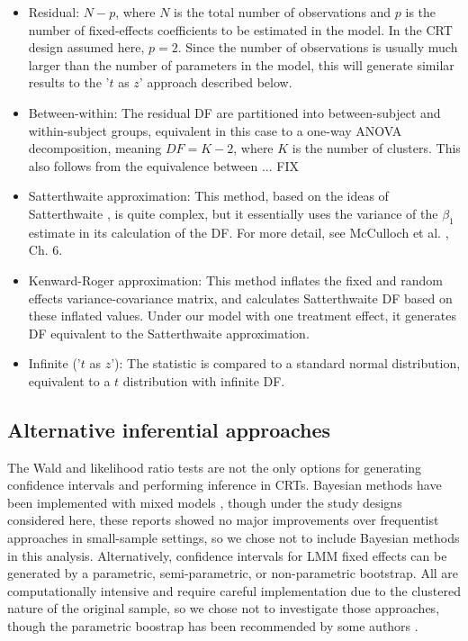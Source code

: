 \documentclass[twocolumn]{bmcart}%
\begin{document}
\begin{itemize}
  \item Residual: $N - p$, where $N$ is the total number of observations and $p$ is the number of fixed-effects coefficients to be estimated in the model. In the CRT design assumed here, $p=2$. Since the number of observations is usually much larger than the number of parameters in the model, this will generate similar results to the '$t$ as $z$' approach described below.
  \item Between-within: The residual DF are partitioned into between-subject and within-subject groups, equivalent in this case to a one-way ANOVA decomposition, meaning $DF = K-2$, where $K$ is the number of clusters. This also follows from the equivalence between ... FIX
  \item Satterthwaite approximation: This method, based on the ideas of Satterthwaite \cite{satterthwaite_approximate_1946}, is quite complex, but it essentially uses the variance of the $\beta_1$ estimate in its calculation of the DF. For more detail, see McCulloch et al. \cite{mcculloch_generalized_2008}, Ch. 6.
  \item Kenward-Roger approximation: This method \cite{kenward_small_1997} inflates the fixed and random effects variance-covariance matrix, and calculates Satterthwaite DF based on these inflated values. Under our model with one treatment effect, it generates DF equivalent to the Satterthwaite approximation.
  \item Infinite ('$t$ as $z$'): The statistic is compared to a standard normal distribution, equivalent to a $t$ distribution with infinite DF.
\end{itemize}

\subsection*{Alternative inferential approaches}

The Wald and likelihood ratio tests are not the only options for generating confidence intervals and performing inference in CRTs. Bayesian methods have been implemented with mixed models \cite{browne_comparison_2006, baldwin_bayesian_2013}, though under the study designs considered here, these reports showed no major improvements over frequentist approaches in small-sample settings, so we chose not to include Bayesian methods in this analysis. Alternatively, confidence intervals for LMM fixed effects can be generated by a parametric, semi-parametric, or non-parametric bootstrap. All are computationally intensive and require careful implementation due to the clustered nature of the original sample, so we chose not to investigate those approaches, though the parametric boostrap has been recommended by some authors \cite{ukyo_improved_2019}.
\end{document}
